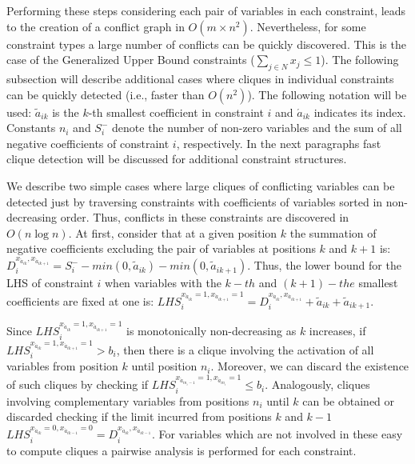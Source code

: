 \documentclass{endm}
\begin{document}
Performing these steps considering each pair of variables in each constraint, leads to the creation of a conflict graph in $O(m \times n^2)$.  Nevertheless, for some constraint types a large number of conflicts can be quickly discovered. This is the case of the Generalized Upper Bound constraints ($\sum_{j\in N}x_j \leq 1$). The following subsection will describe additional cases where cliques in individual constraints can be quickly detected (i.e., faster than $O(n^2)$). The following notation will be used: $\tilde{a}_{ik}$ is the $k$-th smallest coefficient in constraint $i$ and $\acute{a}_{ik}$ indicates its index. Constants $n_i$ and $S_i^-$ denote the number of non-zero variables and the sum of all negative coefficients of constraint $i$, respectively. In the next paragraphs fast clique detection will be discussed for additional constraint structures. 

We describe two simple cases where large cliques of conflicting variables can be detected just by traversing constraints with  coefficients of variables sorted in non-decreasing order. Thus, conflicts in these constraints are discovered in $O( n \log n)$. At first, consider that at a given position $k$ the summation of negative coefficients excluding the pair of variables at positions $k$ and $k+1$ is: $\displaystyle D_{i}^{x_{\acute{a}_{ik}}, x_{\acute{a}_{ik+1}}} = S_i^- - min(0, \tilde{a}_{ik}) - min(0, \tilde{a}_{ik+1})$.  Thus, the lower bound for the LHS of constraint $i$ when variables with the $k-th$ and $(k+1)-the$ smallest coefficients are fixed at one is: $\displaystyle LHS_{i}^{x_{\acute{a}_{ik}} = 1, x_{\acute{a}_{ik+1}} = 1} = D_{i}^{x_{\acute{a}_{ik}}, x_{\acute{a}_{ik+1}}} + \tilde{a}_{ik} + \tilde{a}_{ik+1}$.

Since $LHS_{i}^{x_{\acute{a}_{ik}} = 1, x_{\acute{a}_{ik+1}} = 1}$ is monotonically non-decreasing as $k$ increases, if $LHS_{i}^{x_{\acute{a}_{ik}} = 1, x_{\acute{a}_{ik+1}} = 1} > b_{i}$, then there is a clique involving the activation of all variables from position $k$ until position $n_i$. Moreover, we can discard the existence of such cliques by checking if $LHS_{i}^{x_{\acute{a}_{in_i-1}} = 1, x_{\acute{a}_{in_i}} = 1} \leq b_i$. Analogously, cliques involving complementary variables from positions $n_i$ until $k$ can be obtained or discarded checking if the limit incurred from positions $k$ and $k-1$  $LHS_{i}^{x_{\acute{a}_{ik}} = 0, x_{\acute{a}_{ik-1}} = 0} = D_{i}^{x_{\acute{a}_{ik}}, x_{\acute{a}_{ik-1}}} $. For variables which are not involved in these easy to compute cliques a pairwise analysis is performed for each constraint. 
\end{document}
